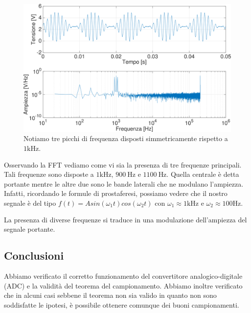 \begin{figure}[H]
\centering
	\includegraphics[width=.65\textwidth]{../E13/latex/am1000hz@10000,200000_crop.pdf}
	\caption{Notiamo tre picchi di frequenza disposti simmetricamente rispetto a $1\si{\kilo\hertz}$.}
	\label{am}
\end{figure}

Osservando la FFT vediamo come vi sia la presenza di tre frequenze principali. Tali frequenze sono disposte a $1\si{\kilo\hertz}$, $\SI{900}{\hertz}$ e $\SI{1100}{\hertz}$. Quella centrale è detta portante mentre le altre due sono le bande laterali che ne modulano l'ampiezza.  Infatti, ricordando le formule di prostaferesi, possiamo vedere che il nostro segnale è del tipo $f(t)=Asin(\omega_1 t)cos(\omega_2 t)$ con $\omega_1 \approx 1 \si{\kilo\hertz}$ e $\omega_2 \approx 100 \si{\hertz}$. 

La presenza di diverse frequenze si traduce in una modulazione dell'ampiezza del segnale portante.



\subsection*{Conclusioni}

Abbiamo verificato il corretto funzionamento del convertitore analogico-digitale (ADC) e la validità del teorema del campionamento. Abbiamo inoltre verificato che in alcuni casi sebbene il teorema non sia valido in quanto non sono soddisfatte le ipotesi, è possibile ottenere comunque dei buoni campionamenti.
